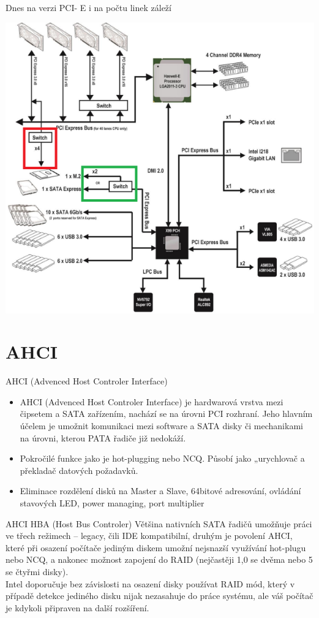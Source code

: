 \documentclass[aspectratio=43]{beamer}
\begin{document}
\begin{frame}{Dnes na verzi PCI- E i na počtu linek záleží}
	 
	\begin{center}
		\includegraphics[width=0.8\linewidth]{extrahovane_obrazky/img_2_page29_0.png}
	\end{center}
	
\end{frame}

\section{AHCI}
\begin{frame}{AHCI (Advenced Host Controler Interface)}
	\begin{itemize}
		\item AHCI (Advenced Host Controler Interface) je hardwarová vrstva mezi čipsetem a SATA zařízením, nachází se na úrovni PCI rozhraní. Jeho hlavním účelem je umožnit komunikaci mezi software a SATA disky či mechanikami na úrovni, kterou PATA řadiče již nedokáží. 
		\item Pokročilé funkce jako je hot-plugging nebo NCQ. Působí jako „urychlovač a překladač datových požadavků.
		\item Eliminace rozdělení disků na Master a Slave, 64bitové adresování, ovládání stavových LED, power managing, port multiplier
	\end{itemize}
	
\end{frame}


\begin{frame}{AHCI HBA (Host Bus Controler)}
	Většina nativních SATA řadičů umožňuje práci ve třech režimech – legacy, čili IDE kompatibilní, druhým je povolení AHCI, které při osazení počítače jediným diskem umožní nejsnazší využívání hot-plugu nebo NCQ, a nakonec možnost zapojení do RAID (nejčastěji 1,0 se dvěma nebo 5 se čtyřmi disky).
	\\
	Intel doporučuje bez závislosti na osazení disky používat RAID mód, který v případě detekce jediného disku nijak nezasahuje do práce systému, ale váš počítač je kdykoli připraven na další rozšíření.
	
\end{frame}
\end{document}
